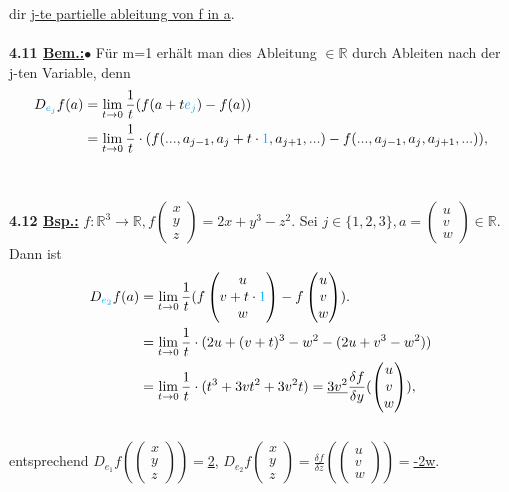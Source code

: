 \documentclass[]{scrartcl}
\begin{document}
	dir \ul{j-te partielle ableitung von f in a}.\\
	\\
	\textbf{4.11 \underline{Bem.:}}$\bullet$ Für m=1 erhält man dies Ableitung $\in \mathbb{R}$ durch Ableiten nach der j-ten Variable, denn 
	\begin{align}
		D_{\textcolor{cyan}{e_j}}f(a)&= \lim\limits_{t\rightarrow 0}\frac{1}{t}(f(a+t\textcolor{cyan}{e_j})-f(a))\\
		&=\lim\limits_{t\rightarrow0}\frac{1}{t}\cdot(f(...,a_{j-1},a_j+t\cdot\textcolor{cyan}{1}, a_{j+1},...)-f(...,a_{j-1},a_j,a_{j+1},...)),
	\end{align} \\
	\\
	\textbf{4.12 \underline{Bsp.:}} $ f:\mathbb{R}^3\rightarrow\mathbb{R}, 
	f\begin{pmatrix}
		x\\y\\z
	\end{pmatrix} = 2x+y^3-z^2.$ Sei $j\in \{1,2,3\}, a=\begin{pmatrix}
	u\\v\\w
\end{pmatrix} \in \mathbb{R}.$\\
Dann ist \begin{align}
	D_{\textcolor{cyan}{e_2}} f(a)&= \lim\limits_{t\rightarrow 
	0}\frac{1}{t}(f\begin{pmatrix}
		u\\v+t\cdot\textcolor{cyan}{1}\\w
	\end{pmatrix}-f\begin{pmatrix}
	u\\v\\w
\end{pmatrix}).\\
&=\lim\limits_{t\rightarrow0}\frac{1}{t}\cdot(2u+(v+t)^3-w^2-(2u+v^3-w^2))\\
&=\lim\limits_{t\rightarrow 
0}\frac{1}{t}\cdot(t^3+3vt^2+3v^2t)=\underline{3v^2}\frac{\delta f}{\delta 
y}(\begin{pmatrix}
	u\\v\\w
\end{pmatrix}),
\end{align}\\
entsprechend $D_{e_1}f(\begin{pmatrix}
	x\\y\\z
\end{pmatrix})=$\underline{2}, $D_{e_2}f\begin{pmatrix}
	x\\y\\z
\end{pmatrix}=\frac{\delta f}{\delta z}(\begin{pmatrix}
	u\\v\\w
\end{pmatrix})=$\underline{-2w}.\\
\end{document}
